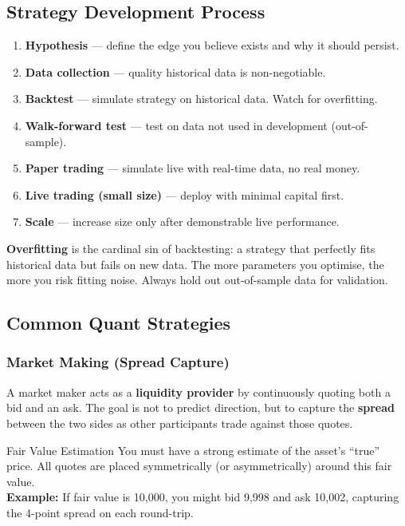 \subsection{Strategy Development Process}
\begin{enumerate}[label=\textbf{\arabic*.}]
  \item \textbf{Hypothesis} — define the edge you believe exists and why it should persist.
  \item \textbf{Data collection} — quality historical data is non-negotiable.
  \item \textbf{Backtest} — simulate strategy on historical data. Watch for overfitting.
  \item \textbf{Walk-forward test} — test on data not used in development (out-of-sample).
  \item \textbf{Paper trading} — simulate live with real-time data, no real money.
  \item \textbf{Live trading (small size)} — deploy with minimal capital first.
  \item \textbf{Scale} — increase size only after demonstrable live performance.
\end{enumerate}

\begin{warningbox}
\textbf{Overfitting} is the cardinal sin of backtesting: a strategy that perfectly fits
historical data but fails on new data. The more parameters you optimise, the more you
risk fitting noise. Always hold out out-of-sample data for validation.
\end{warningbox}

\subsection{Common Quant Strategies}

\subsubsection{Market Making (Spread Capture)}

A market maker acts as a \textbf{liquidity provider} by continuously quoting both a bid
and an ask. The goal is not to predict direction, but to capture the \textbf{spread}
between the two sides as other participants trade against those quotes.

\begin{keyterm}{Fair Value Estimation}
You must have a strong estimate of the asset's ``true'' price. All quotes are placed
symmetrically (or asymmetrically) around this fair value.
\\\textbf{Example:} If fair value is 10{,}000, you might bid 9{,}998 and ask 10{,}002,
capturing the 4-point spread on each round-trip.
\end{keyterm}

